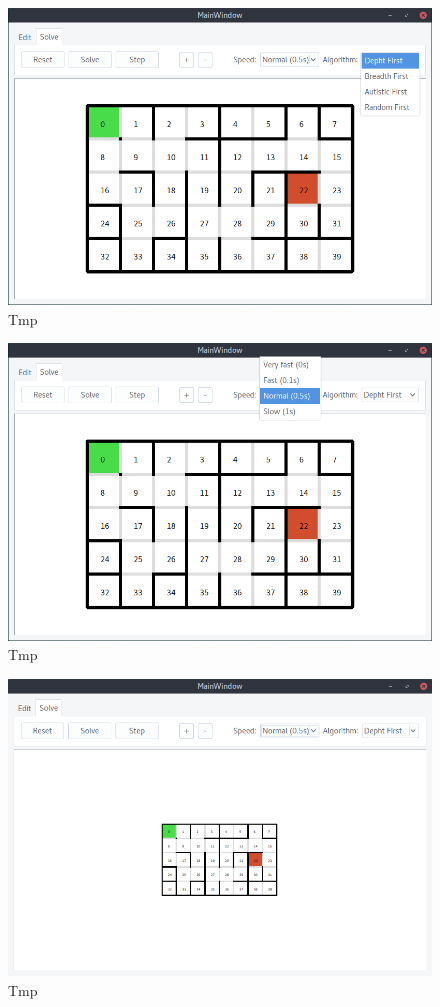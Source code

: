 \documentclass[12pt,a4paper]{article}
\begin{document}
	\begin{figure}[H]
		\centering
		\includegraphics[width=0.8\linewidth]{obrazki/9_new.png}
		\caption{Tmp}
	\end{figure}
	
	\begin{figure}[H]
		\centering
		\includegraphics[width=0.8\linewidth]{obrazki/10_new.png}
		\caption{Tmp}
	\end{figure}
	
	\begin{figure}[H]
		\centering
		\includegraphics[width=0.8\linewidth]{obrazki/11.png}
		\caption{Tmp}
	\end{figure}
	
\end{document}
